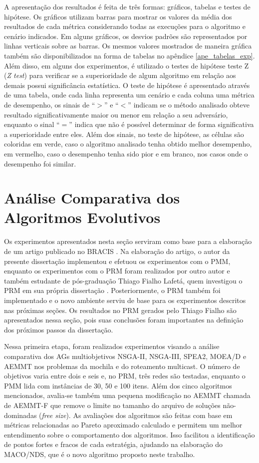 A apresentação dos resultados é feita de três formas: gráficos, tabelas e testes de hipótese. Os gráficos utilizam barras para mostrar os valores da média dos resultados de cada métrica considerando todas as execuções para o algoritmo e cenário indicados. Em alguns gráficos, os desvios padrões são representados por linhas verticais sobre as barras. Os mesmos valores mostrados de maneira gráfica também são disponibilizados na forma de tabelas no apêndice \ref{ape_tabelas_exp}. Além disso, em alguns dos experimentos, é utilizado o testes de hipótese teste Z (\textit{Z test}) para verificar se a superioridade de algum algoritmo em relação aos demais possui significância estatística. O teste de hipótese é apresentado através de uma tabela, onde cada linha representa um cenário e cada coluna uma métrica de desempenho, os sinais de ``$>$'' e ``$<$'' indicam se o método analisado obteve resultado significativamente maior ou menor em relação a seu adversário, enquanto o sinal ``$=$'' indica que não é possível determinar de forma significativa a superioridade entre eles. Além dos sinais, no teste de hipótese, as células são coloridas em verde, caso o algoritmo analisado tenha obtido melhor desempenho, em vermelho, caso o desempenho tenha sido pior e em branco, nos casos onde o desempenho foi similar.

\section{Análise Comparativa dos Algoritmos Evolutivos}
\label{section_experimentos_etapa1}

Os experimentos apresentados nesta seção serviram como base para a elaboração de um artigo publicado no \ac{BRACIS} \cite{Franca2017}. Na elaboração do artigo, o autor da presente dissertação implementou e efetuou os experimentos com o PMM, enquanto os experimentos com o PRM foram realizados por outro autor e também estudante de pós-graduação Thiago Fialho Lafetá, quem investigou o PRM em sua própria dissertação \cite{LafetaThesis}. Posteriormente, o PRM também foi implementado e o novo ambiente serviu de base para os experimentos descritos nas próximas seções. Os resultados no PRM gerados pelo Thiago Fialho são apresentados nessa seção, pois suas conclusões foram importantes na definição dos próximos passos da dissertação.

Nessa primeira etapa, foram realizados experimentos visando a análise comparativa dos AGs multiobjetivos NSGA-II, NSGA-III, SPEA2, MOEA/D e AEMMT nos problemas da mochila e do roteamento multicast. O número de objetivos varia entre dois e seis e, no PRM, três redes são testadas, enquanto o PMM lida com instâncias de 30, 50 e 100 itens. Além dos cinco algoritmos mencionados, avalia-se também uma pequena modificação no AEMMT chamada de AEMMT-F que remove o limite no tamanho do arquivo de soluções não-dominadas (\textit{free size}). As avaliações dos algoritmos são feitas com base em métricas relacionadas ao Pareto aproximado calculado e permitem um melhor entendimento sobre o comportamento dos algoritmos. Isso facilitou a identificação de pontos fortes e fracos de cada estratégia, ajudando na elaboração do MACO/NDS, que é o novo algoritmo proposto neste trabalho.

